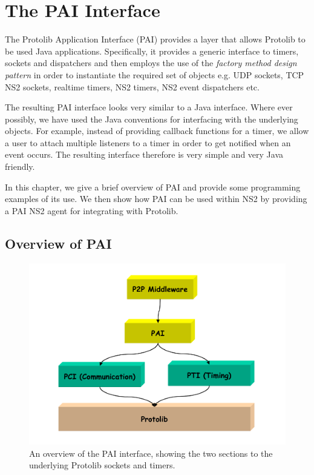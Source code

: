 \chapter{The PAI Interface}
\label{pai}

The Protolib Application Interface (PAI) provides a layer that allows Protolib to be used Java applications. Specifically, it provides a generic interface to timers, sockets and dispatchers and then employs the use of the \emph{factory method design pattern} in order to instantiate the required set of objects e.g. UDP sockets, TCP NS2 sockets, realtime timers, NS2 timers, NS2 event dispatchers etc.  

The resulting PAI interface looks very similar to a Java interface. Where ever 
possibly, we have used the Java conventions for interfacing with the underlying objects. For example, instead of providing callback functions for a timer, we allow a user to attach multiple listeners to a timer in order to get notified when an event occurs.  The resulting interface therefore is very simple and very Java friendly.  

In this chapter, we give a brief overview of PAI and provide some programming examples of its use. We then show how PAI can be used within NS2 by providing a PAI NS2 agent for integrating with Protolib.

\section{Overview of PAI}

\begin{figure}
\centering
\includegraphics[scale=0.4]{images/paiOverview}
\caption{An overview of the PAI interface, showing the two sections to the
underlying Protolib sockets and timers.} 
\label{pai:fig:overview}
\end{figure}

